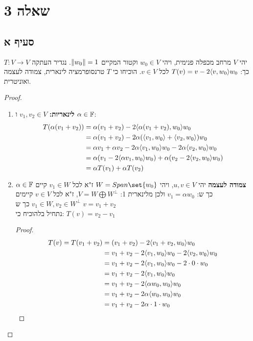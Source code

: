 \documentclass{article}
\DeclarePairedDelimiter\set\{\}
\begin{document}
	\pagebreak
	\section*{שאלה 3}
	\subsection*{סעיף א}
	יהי $V$ מרחב מכפלה פנימית, ויהי $w_0 \in V$ וקטור המקיים $\lVert w_0 \rVert = 1$.
	נגדיר העתקה $T: V \rightarrow V$ כך:
	$T(v) = v - 2\langle v, w_0 \rangle w_0$ לכל $v \in V$.
	הוכיחו כי $T$ טרנסופרמציה לינארית, צמודה לעצמה ואוניטרית.
	\begin{proof}
		\begin{enumerate}
			\item \textbf{לינאריות:} $v_1, v_2 \in V$ ו $\alpha \in \mathbb{F}$:
			\begin{align*}
				T(\alpha (v_1 + v_2))
				&= \alpha (v_1 + v_2) - 2\langle \alpha (v_1 + v_2), w_0 \rangle w_0 \\
				&= \alpha (v_1 + v_2) - 2\alpha(\langle v_1, w_0 \rangle + \langle v_2, w_0 \rangle)w_0 \\
				&= \alpha v_1 + \alpha v_2 - 2\alpha\langle v_1, w_0 \rangle w_0 - 2\alpha\langle  v_2, w_0 \rangle w_0 \\
				&= \alpha (v_1 - 2\langle \alpha v_1, w_0 \rangle w_0) + \alpha (v_2 - 2\langle v_2, w_0 \rangle w_0) \\
				&= \alpha T(v_1) + \alpha T(v_2)
			\end{align*}
			\item \textbf{צמודה לעצמה} יהי $u, v \in V$, ויהי $W = Span \set{w_0}$  ז"א לכל $v_1 \in W$ קיים $\alpha \in \mathbb{F}$ כך ש: $v_1 = \alpha w_0$
			 ולכן מלינארית 1: ${V = W \bigoplus W^{\perp}}$,
			 ז"א לכל $v \in V$ קיימים $v_1 \in W, v_2 \in W^{\perp}$ כך ש $v = v_1 + v_2$ \\
			 נתחיל בלהוכיח כי: $T(v) = v_2 - v_1$
			 \begin{proof}
				\begin{align*}
					T(v)
					= T(v_1 + v_2)
					&= (v_1 + v_2) - 2\ang{v_1 + v_2, w_0}w_0 \\
					&= v_1 + v_2 - 2\ang{v_1, w_0}w_0 -2\ang{v_2, w_0}w_0 \\
					&= v_1 + v_2 - 2\ang{v_1, w_0}w_0 - 2 \cdot 0 \cdot w_0 \\
					&= v_1 + v_2 - 2\ang{v_1, w_0}w_0 \\
					&= v_1 + v_2 - 2\ang{\alpha w_0, w_0}w_0 \\
					&= v_1 + v_2 - 2\alpha\ang{w_0, w_0}w_0 \\
					&= v_1 + v_2 - 2\alpha \cdot 1 \cdot w_0 \\

\end{align*}
\end{proof}
\end{enumerate}
\end{proof}
\end{document}
